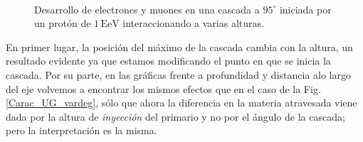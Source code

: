 \documentclass[12 pt, a4paper]{article} %
\numberwithin{equation}{section}
\numberwithin{figure}{section}
\numberwithin{table}{section}
\begin{document}
\begin{figure}[H]
	\centering
	\\

	\caption{Desarrollo de electrones y muones en una cascada a $95^\circ$ iniciada por un protón de $1\,\mathrm{EeV}$ interaccionando a varias alturas.}
	\label{Carac_UG_varh}
\end{figure}
En primer lugar, la posición del máximo de la cascada cambia con la altura, un resultado evidente ya que estamos modificando el punto en que se inicia la cascada. Por su parte, en las gráficas frente a profundidad y distancia  alo largo del eje volvemos a encontrar los mismos efectos que en el caso de la Fig. \ref{Carac_UG_vardeg}, sólo que ahora la diferencia en la materia atravesada viene dada por la altura de \textit{inyección} del primario y no por el ángulo de la cascada; pero la interpretación es la misma.
\end{document}
